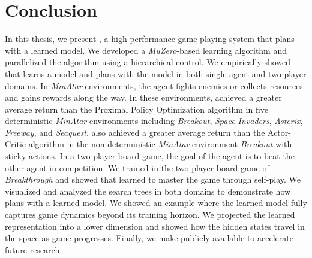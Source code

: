 \chapter{Conclusion}

In this thesis, we present \moozi, a high-performance game-playing system that plans with a learned model.
We developed a \textit{MuZero}-based learning algorithm and parallelized the algorithm using a hierarchical control.
We empirically showed that \moozi learns a model and plans with the model in both single-agent and two-player domains.
In \textit{MinAtar} environments, the agent fights enemies or collects resources and gains rewards along the way.
In these environments, \moozi achieved a greater average return than the Proximal Policy Optimization algorithm in five deterministic \textit{MinAtar} environments including \textit{Breakout}, \textit{Space Invaders}, \textit{Asterix}, \textit{Freeway}, and \textit{Seaquest}.
\moozi also achieved a greater average return than the Actor-Critic algorithm in the non-deterministic \textit{MinAtar} environment \textit{Breakout} with sticky-actions.
In a two-player board game, the goal of the agent is to beat the other agent in competition.
We trained \moozi in the two-player board game of \textit{Breakthrough} and showed that \moozi learned to master the game through self-play.
We visualized and analyzed the search trees in both domains to demonstrate how \moozi plans with a learned model.
We showed an example where the learned model fully captures game dynamics beyond its training horizon.
We projected the learned representation into a lower dimension and showed how the hidden states travel in the space as game progresses.
Finally, we make \moozi publicly available to accelerate future research.
